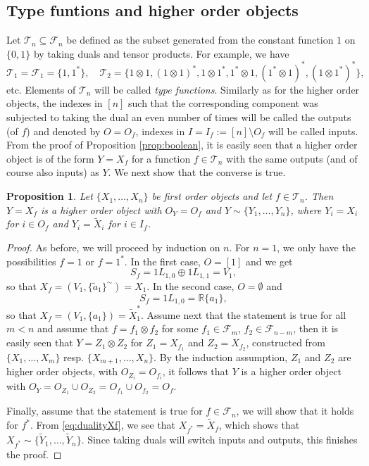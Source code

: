 \documentclass[12pt]{article}
\newtheorem{prop}{Proposition}
\theoremstyle{definition}
\theoremstyle{remark}
\newtheorem{exm}{Example}
\def\Te{\mathcal T}
\def\Fe{\mathcal F}
\begin{document}





\subsection{Type funtions and higher order objects}


Let $\Te_n\subseteq \Fe_n$ be defined as the subset generated from the constant 
function $1$ on $\{0,1\}$ by taking duals and tensor products. For example, we have
\[
\Te_1=\Fe_1=\{1,1^*\},\quad
\Te_2=\{1\otimes 1, (1\otimes 1)^*, 1\otimes 1^*,1^*\otimes 1, (1^*\otimes 1)^*,
(1\otimes 1^*)^*\},
\]
etc.  Elements of $\Te_n$ will be called {\em type functions}. Similarly as for the higher order
objects, the indexes in $[n]$ such that the corresponding
component was subjected to taking the dual an even number of times will be called the
outputs (of $f$) and denoted by $O=O_f$, indexes in $I=I_f:=[n]\setminus O_f$ will be
called inputs. From the proof of Proposition \ref{prop:boolean}, it is easily seen that a
higher order object is of the form $Y=X_f$ for a function $f\in \Te_n$ with the same outputs (and of
course also inputs) as $Y$. We next show that the converse is true. 


\begin{prop}\label{prop:type_hom} Let $\{X_1,\dots, X_n\}$  be first order objects  and let
$f\in \Te_n$. Then $Y=X_f$ is a higher order object with $O_Y=O_f$ and  $Y\sim
\{Y_1,\dots, Y_n\}$, where $Y_i=X_i$ for $i\in O_f$ and $Y_i=\tilde X_i$ for
$i\in I_f$.  

\end{prop}

\begin{proof} As before, we will proceed by induction on $n$. For $n=1$, we only have the
possibilities $f=1$ or $f=1^*$. In the first case, $O=[1]$ and we get
\[
S_f=1L_{1,0}\oplus 1L_{1,1}= V_{1},
\]
so that $X_f=(V_1,\{\tilde a_1\}^\sim)=X_1$. In the second case, $O=\emptyset$ and 
\[
S_f=1L_{1,0}=\mathbb R\{a_1\},
\]
so that $X_f=(V_1,\{a_1\})=\tilde X_1^*$. Assume next that the statement
is true for all $m<n$ and assume that $f=f_1\otimes f_2$ for some $f_1\in \Fe_m$, $f_2\in
\Fe_{n-m}$, then it is easily seen that $Y=Z_1\otimes Z_2$ for $Z_1=X_{f_1}$ and
$Z_2=X_{f_2}$, constructed from $\{X_1,\dots,X_m\}$ resp. $\{X_{m+1},\dots, X_n\}$. 
By the induction assumption, $Z_1$ and $Z_2$ are higher order objects, with
$O_{Z_i}=O_{f_i}$, it follows that $Y$ is a higher order object with $O_Y=O_{Z_1}\cup
O_{Z_2}=O_{f_1}\cup O_{f_2}=O_f$.

Finally, assume that the statement is true for $f\in \Fe_n$, we will show that it holds
for $f^*$. From \eqref{eq:dualityXf}, we see that $X_{f^*}=\tilde X_f$, which shows that 
$X_{f^*}\sim\{\tilde Y_1,\dots, \tilde Y_n\}$. Since taking duals will switch inputs and
outputs, this finishes the proof.




\end{proof}
\end{document}
